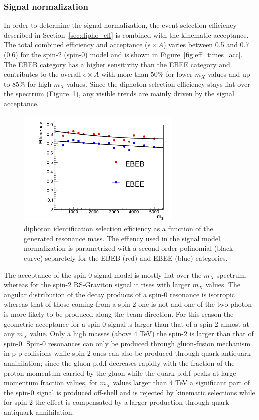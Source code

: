\subsubsection{Signal normalization}
In order to determine the signal normalization, the event selection efficiency
described in Section~\ref{sec:dipho_eff} is combined with the kinematic acceptance.
The total combined efficiency and acceptance ($\epsilon\times A$)
varies between 0.5 and 0.7 (0.6) for the spin-2 (spin-0) model and is shown in Figure~\ref{fig:eff_times_acc}. The EBEB
category has a higher sensitivity than the EBEE category and contributes to the overall
$\epsilon\times A$ with more than $50\%$ for lower $m_X$ values and up to $85\%$ for high $m_X$ values. Since
the diphoton selection efficiency stays flat over the \mgg spectrum (Figure~\ref{fig:eff_reco_sig}), any
visible trends are mainly driven by the signal acceptance.

\begin{figure}[h!]
  \centering
  \includegraphics[width = 0.7\textwidth]{figures/diphotons/avg_eff_reco.png}
  \caption{diphoton identification selection efficiency as a function of the generated resonance mass.
    The effiency used in the signal model normalization is parametrized with a second order polinomial (black curve)
    separetely for the EBEB (red) and EBEE (blue) categories.}
  \label{fig:eff_reco_sig}
\end{figure}

The acceptance of the spin-0 signal model is mostly flat over the $m_X$ spectrum,
whereas for the spin-2 RS-Graviton signal it rises with larger $m_X$ values.
The angular distribution of the decay products of a spin-0 resonance is isotropic 
whereas that of those coming from a spin-2 one is not and one of the two photon is more likely
to be produced along the beam direction.
For this reason the geometric acceptance for a spin-0 signal is larger than that of a spin-2
almost at any $m_X$ value. Only a high masses (above 4 TeV) the spin-2 is larger than that of spin-0.
Spin-0 resonances can only be produced through gluon-fusion mechanism in p-p collisions while
spin-2 ones can also be produced through quark-antiquark annihilation; since
the gluon p.d.f decreases rapidly with the fraction of the proton momentum carried by the gluon while 
the quark p.d.f peaks at large momentum fraction values, for $m_X$ values larger than 4 TeV a significant
part of the spin-0 signal is produced off-shell and is rejected by kinematic selections while for spin-2
the effect is compensated by a larger production through quark-antiquark annihilation.

